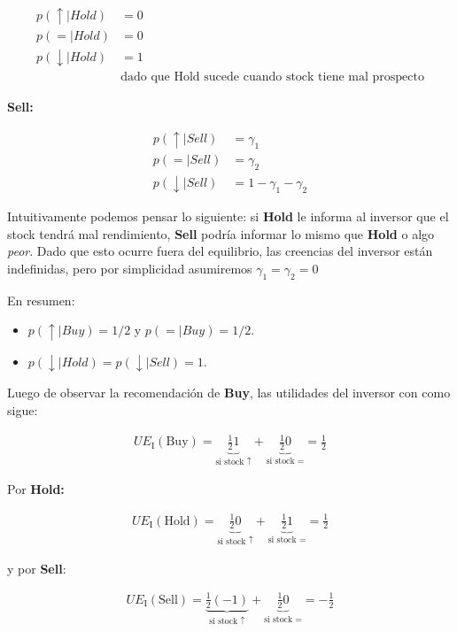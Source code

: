 \documentclass[12pt]{article}
\newcommand{\UE}[2]{UE_{\text{#1}}(#2)}
\begin{document}
\begin{align*}
	p(\uparrow | Hold) &= 0 \\
	p(= | Hold) &= 0 \\
	p(\downarrow | Hold) &= 1 \\ 
	&\text{dado que Hold sucede cuando stock tiene mal prospecto}
\end{align*}

\textbf{Sell:}

\begin{align*}
	p(\uparrow | Sell) &= \gamma_1 \\
	p(= | Sell) &= \gamma_2 \\
	p(\downarrow | Sell) &= 1-\gamma_1 - \gamma_2 
\end{align*}

Intuitivamente podemos pensar lo siguiente: si \textbf{Hold} le informa al inversor que el stock tendrá mal rendimiento, \textbf{Sell} podría informar lo mismo que \textbf{Hold} o algo \textit{peor}. Dado que esto ocurre fuera del equilibrio, las creencias del inversor están indefinidas, pero por simplicidad asumiremos $ \gamma_1 = \gamma_2 = 0 $

En resumen:

\begin{itemize}
	\setlength{\itemsep}{0pt}
	\setlength{\parskip}{0pt}
	\setlength{\parsep}{0pt}
	\item $ p(\uparrow | Buy) = 1/2 $ y $ p(= | Buy) = 1/2$.
	\item $ p(\downarrow | Hold) = p(\downarrow | Sell) = 1$.
\end{itemize}

Luego de observar la recomendación de \textbf{Buy}, las utilidades del inversor con como sigue:

\begin{align*}
	\UE{I}{\text{Buy}} = \underbrace{\frac{1}{2}1}_{\text{si stock } \uparrow} + \underbrace{\frac{1}{2}0}_{\text{si stock } =} = \frac{1}{2}
\end{align*}

Por \textbf{Hold:}

\begin{align*}
	\UE{I}{\text{Hold}} = \underbrace{\frac{1}{2}0}_{\text{si stock } \uparrow} + \underbrace{\frac{1}{2}1}_{\text{si stock } =} = \frac{1}{2}
\end{align*}

y por \textbf{Sell}:

\begin{align*}
	\UE{I}{\text{Sell}} = \underbrace{\frac{1}{2}(-1)}_{\text{si stock } \uparrow} + \underbrace{\frac{1}{2}0}_{\text{si stock } =} = -\frac{1}{2}
\end{align*}
\end{document}
